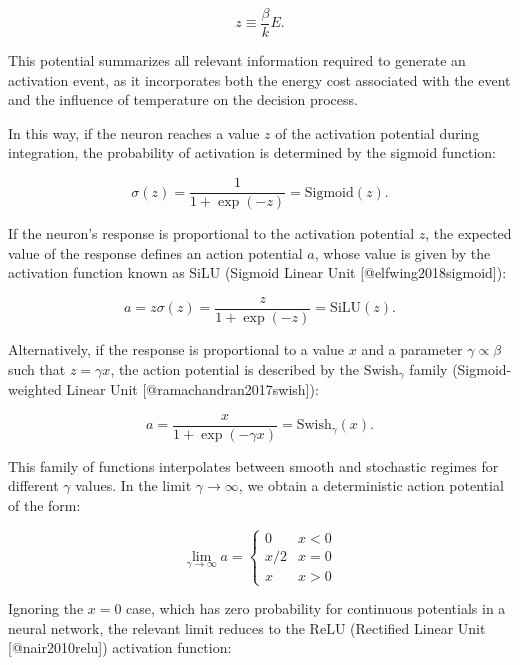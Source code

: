 \documentclass[12pt]{article}
\begin{document}
\begin{equation}
z \equiv \frac{\beta}{k} E.
\end{equation}

This potential summarizes all relevant information required to generate an activation event, as it incorporates both the energy cost associated with the event and the influence of temperature on the decision process. 

In this way, if the neuron reaches a value $z$ of the activation potential during integration, the probability of activation is determined by the sigmoid function:

\begin{equation}
\sigma(z) = \frac{1}{1+\exp(-z)} = \text{Sigmoid}(z).
\end{equation}

If the neuron’s response is proportional to the activation potential $z$, the expected value of the response defines an action potential $a$, whose value is given by the activation function known as $\text{SiLU}$ (Sigmoid Linear Unit  [@elfwing2018sigmoid]):

\begin{equation}
a = z \sigma(z) = \frac{z}{1+\exp(-z)} = \text{SiLU}(z).
\end{equation}

Alternatively, if the response is proportional to a value $x$ and a parameter $\gamma \propto \beta$ such that $z = \gamma x$, the action potential is described by the $\text{Swish}_{\gamma}$ family (Sigmoid-weighted Linear Unit [@ramachandran2017swish]):

\begin{equation}
a = \frac{x}{1+\exp(-\gamma x)} = \text{Swish}_{\gamma}(x).
\end{equation}

This family of functions interpolates between smooth and stochastic regimes for different $\gamma$ values. In the limit $\gamma \rightarrow \infty$, we obtain a deterministic action potential of the form:

\begin{equation}
\lim_{\gamma \rightarrow \infty} a =  
\begin{cases}  
0 & x < 0 \\  
x/2 & x = 0 \\  
x & x > 0  
\end{cases}
\end{equation}

Ignoring the $x = 0$ case, which has zero probability for continuous potentials in a neural network, the relevant limit reduces to the $\text{ReLU}$ (Rectified Linear Unit [@nair2010relu]) activation function:
\end{document}
